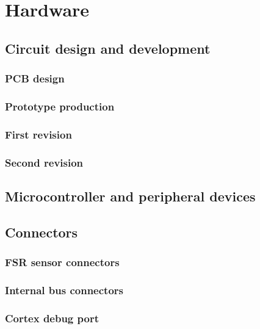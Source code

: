 \chapter{Hardware}

\section{Circuit design and development}

\subsection{PCB design}
\subsection{Prototype production}
\subsection{First revision}
\subsection{Second revision}

\section{Microcontroller and peripheral devices}

\section{Connectors}

\subsection{FSR sensor connectors}
\subsection{Internal bus connectors}
\subsection{Cortex debug port}


